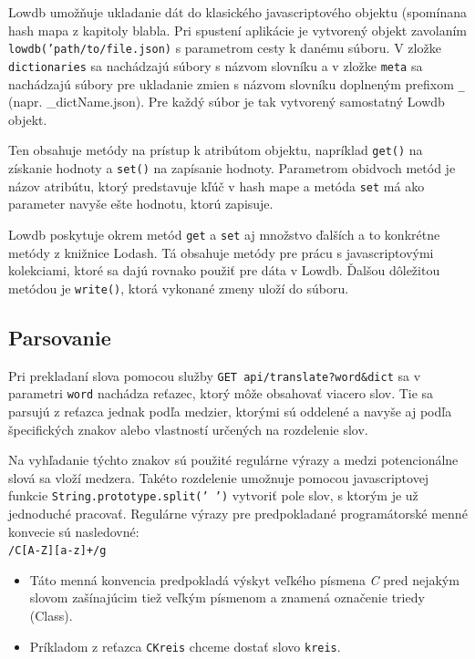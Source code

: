 \documentclass[
  digital, %
  table,   %
  lof,     %
  lot,     %
]{fithesis3}
\begin{document}
Lowdb umožňuje ukladanie dát do klasického javascriptového objektu (spomínana hash mapa z kapitoly blabla. Pri spustení aplikácie je vytvorený objekt zavolaním \texttt{lowdb('path/to/file.json)} s parametrom cesty k danému súboru. V zložke \texttt{dictionaries} sa nachádzajú súbory s názvom slovníku a v zložke \texttt{meta} sa nachádzajú súbory pre ukladanie zmien s názvom slovníku doplneným prefixom \texttt{\_} (napr. \_dictName.json). Pre každý súbor je tak vytvorený samostatný Lowdb objekt.

Ten obsahuje metódy na prístup k atribútom objektu, napríklad \texttt{get()} na získanie hodnoty a \texttt{set()} na zapísanie hodnoty. Parametrom obidvoch metód je názov atribútu, ktorý predstavuje kľúč v hash mape a metóda \texttt{set} má ako parameter navyše ešte hodnotu, ktorú zapisuje.

Lowdb poskytuje okrem metód \texttt{get} a \texttt{set} aj množstvo ďalších a to konkrétne metódy z knižnice Lodash. Tá obsahuje metódy pre prácu s javascriptovými kolekciami, ktoré sa dajú rovnako použiť pre dáta v Lowdb. Ďalšou dôležitou metódou je \texttt{write()}, ktorá vykonané zmeny uloží do súboru.

\subsection{Parsovanie}
Pri prekladaní slova pomocou služby \texttt{GET api/translate?word\&dict} sa v parametri \texttt{word} nachádza reťazec, ktorý môže obsahovať viacero slov. Tie sa parsujú z reťazca jednak podľa medzier, ktorými sú oddelené a navyše aj podľa špecifických znakov alebo vlastností určených na rozdelenie slov.

Na vyhľadanie týchto znakov sú použité regulárne výrazy a medzi potencionálne slová sa vloží medzera. Takéto rozdelenie umožnuje pomocou javascriptovej funkcie \texttt{String.prototype.split(' ')} vytvoriť pole slov, s ktorým je už jednoduché pracovať. Regulárne výrazy pre predpokladané programátorské menné konvecie sú nasledovné:
\\

\noindent
\texttt{/C[A-Z][a-z]+/g}
\begin{itemize}
\item Táto menná konvencia predpokladá výskyt veľkého písmena \textit{C} pred nejakým slovom zašínajúcim tiež veľkým písmenom a znamená označenie triedy (Class).
\item Príkladom z reťazca \texttt{CKreis} chceme dostať slovo \texttt{kreis}.
\end{itemize}
\end{document}
